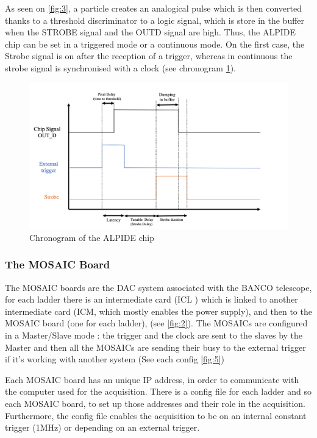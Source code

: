 \documentclass[12pt,oneside,a4]{article}
\begin{document}
    As seen on \ref{fig:3}, a particle creates an analogical pulse which is then converted thanks to a threshold discriminator to a logic signal, which is store in the buffer when the STROBE signal and the OUTD signal are high. Thus, the ALPIDE chip can be set in a triggered mode or a continuous mode. On the first case, the Strobe signal is on after the reception of a trigger, whereas in continuous the strobe signal is synchronised with a clock (see chronogram \ref{fig:4}).

    \begin{figure}[h]
        \centering
        \includegraphics[scale =0.5]{figures/ALPIDE Chronogram.png}
        \caption{Chronogram of the ALPIDE chip}
        \label{fig:4}
    \end{figure}

    
        \subsubsection{The MOSAIC Board}
    The MOSAIC boards are the DAC system associated with the BANCO telescope, for each ladder there is an intermediate card (ICL ) which is linked to another intermediate card (ICM, which mostly enables the power supply), and then to the MOSAIC board (one for each ladder), (see \ref{fig:2}). The MOSAICs are configured in a Master/Slave mode : the trigger and the clock are sent to the slaves by the Master and then all the MOSAICs are sending their busy to the external trigger if it's working with another system (See each config \ref{fig:5})

Each MOSAIC board has an unique IP address, in order to communicate with the computer used for the acquisition. There is a config file for each ladder and so each MOSAIC board, to set up those addresses and their role in the acquisition. Furthermore, the config file enables the acquisition to be on an internal constant trigger (1MHz) or depending on an external trigger.
\end{document}
